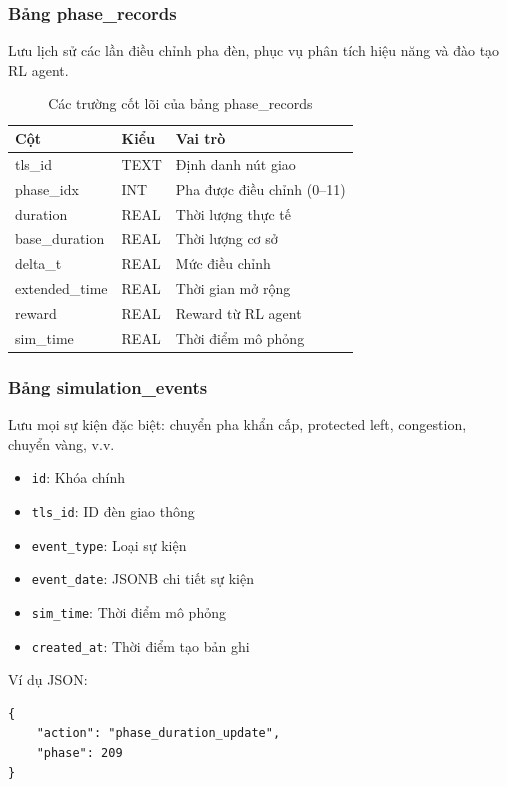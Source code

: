\subsubsection{Bảng phase\_records}

Lưu lịch sử các lần điều chỉnh pha đèn, phục vụ phân tích hiệu năng và đào tạo RL agent.

\begin{table}[H]
\centering
\begin{tabular}{llp{7cm}}
\toprule
\textbf{Cột} & \textbf{Kiểu} & \textbf{Vai trò} \\
\midrule
tls\_id         & TEXT    & Định danh nút giao \\
phase\_idx      & INT     & Pha được điều chỉnh (0--11) \\
duration        & REAL    & Thời lượng thực tế \\
base\_duration  & REAL    & Thời lượng cơ sở \\
delta\_t        & REAL    & Mức điều chỉnh \\
extended\_time  & REAL    & Thời gian mở rộng \\
reward          & REAL    & Reward từ RL agent \\
sim\_time       & REAL    & Thời điểm mô phỏng \\
\bottomrule
\end{tabular}
\caption{Các trường cốt lõi của bảng phase\_records}
\end{table}

\subsubsection{Bảng simulation\_events}

Lưu mọi sự kiện đặc biệt: chuyển pha khẩn cấp, protected left, congestion, chuyển vàng, v.v.

\begin{itemize}
    \item \texttt{id}: Khóa chính
    \item \texttt{tls\_id}: ID đèn giao thông
    \item \texttt{event\_type}: Loại sự kiện
    \item \texttt{event\_date}: JSONB chi tiết sự kiện
    \item \texttt{sim\_time}: Thời điểm mô phỏng
    \item \texttt{created\_at}: Thời điểm tạo bản ghi
\end{itemize}

Ví dụ JSON:
\begin{lstlisting}[style=json]
{
    "action": "phase_duration_update",
    "phase": 209
}
\end{lstlisting}

